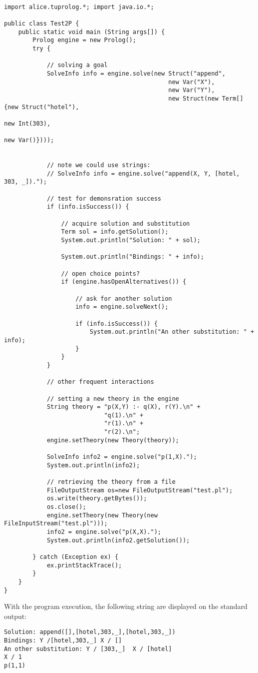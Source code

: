 {\tt\scriptsize{\begin{verbatim}

import alice.tuprolog.*; import java.io.*;

public class Test2P {
    public static void main (String args[]) {
        Prolog engine = new Prolog();
        try {

            // solving a goal
            SolveInfo info = engine.solve(new Struct("append",
                                              new Var("X"),
                                              new Var("Y"),
                                              new Struct(new Term[]{new Struct("hotel"),
                                                                    new Int(303),
                                                                    new Var()})));


            // note we could use strings:
            // SolveInfo info = engine.solve("append(X, Y, [hotel, 303, _]).");

            // test for demonsration success
            if (info.isSuccess()) {

                // acquire solution and substitution
                Term sol = info.getSolution();
                System.out.println("Solution: " + sol);

                System.out.println("Bindings: " + info);

                // open choice points?
                if (engine.hasOpenAlternatives()) {

                    // ask for another solution
                    info = engine.solveNext();

                    if (info.isSuccess()) {
                        System.out.println("An other substitution: " + info);
                    }
                }
            }

            // other frequent interactions

            // setting a new theory in the engine
            String theory = "p(X,Y) :- q(X), r(Y).\n" +
                            "q(1).\n" +
                            "r(1).\n" +
                            "r(2).\n";
            engine.setTheory(new Theory(theory));

            SolveInfo info2 = engine.solve("p(1,X).");
            System.out.println(info2);

            // retrieving the theory from a file
            FileOutputStream os=new FileOutputStream("test.pl");
            os.write(theory.getBytes());
            os.close();
            engine.setTheory(new Theory(new FileInputStream("test.pl")));
            info2 = engine.solve("p(X,X).");
            System.out.println(info2.getSolution());

        } catch (Exception ex) {
            ex.printStackTrace();
        }
    }
}
\end{verbatim}}}

With the program execution, the following string are displayed on
the standard output:

{\tt\small{

\begin{verbatim}
Solution: append([],[hotel,303,_],[hotel,303,_])
Bindings: Y /[hotel,303,_] X / []
An other substitution: Y / [303,_]  X / [hotel]
X / 1
p(1,1)
\end{verbatim}}}